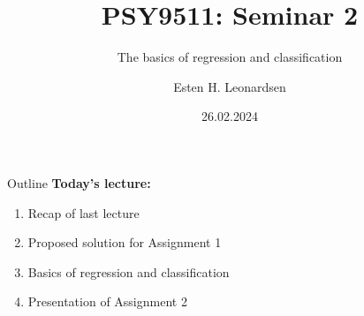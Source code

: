 \documentclass[10pt]{beamer}
\title{PSY9511: Seminar 2}
\subtitle{The basics of regression and classification}
\author{Esten H. Leonardsen}
\date{26.02.2024}
\begin{document}
	\begin{frame}
	 	\titlepage
	\end{frame}

    \begin{frame}{Outline}
        \textbf{Today's lecture:}
        \begin{enumerate}
            \item Recap of last lecture
            \item Proposed solution for Assignment 1
            \item Basics of regression and classification
            \item Presentation of Assignment 2
        \end{enumerate}
    \end{frame}

    
    



\end{document}

